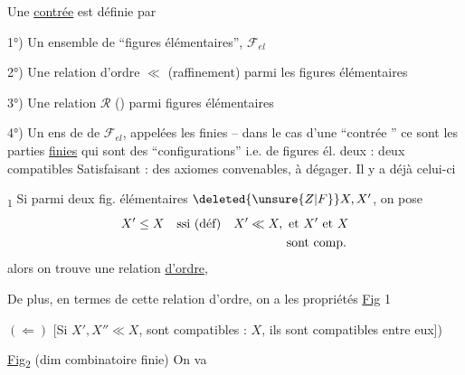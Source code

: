 Une \uline{contrée} est définie par

1°) Un ensemble de ``figures élémentaires'', $\mathcal{F}_{el}$

2°) Une relation d'ordre $\ll$  (raffinement) parmi les figures élémentaires

3°) Une relation   $\mathcal{R}$ () parmi figures élémentaires


4°) Un ens de  de $\mathcal{F}_{el}$, appelées les \unsure{---} finies -- dans le cas d'une ``contrée '' ce sont les parties \uline{finies} qui sont des ``configurations''  i.e.  de figures él. deux : deux compatibles
Satisfaisant : des axiomes convenables, à dégager. Il y a déjà celui-ci

\uline{}\textsubscript{1}  Si parmi deux fig. élémentaires $\deleted{\unsure{Z|F}}X, X'$, on pose
\[
\begin{aligned}
X'\leq X\quad &\text{ssi (déf)}\quad X'\ll X,\ \text{et }X'\text{ et }X\\
&\hphantom{\text{ssi (déf)}\quad X'\ll X,\ }\text{sont comp.}
\end{aligned}
\]
alors on trouve une relation \uline{d'ordre},

De plus, en termes de cette relation d'ordre, on a les propriétés \uline{Fig} 1

\margin{$\vert\vert\vert$}
$(\Longleftarrow)$ [Si $X', X''\ll X$,  sont compatibles : $X$, ils sont compatibles entre eux])

\uline{Fig}\textsubscript{2} (dim combinatoire finie) On va
